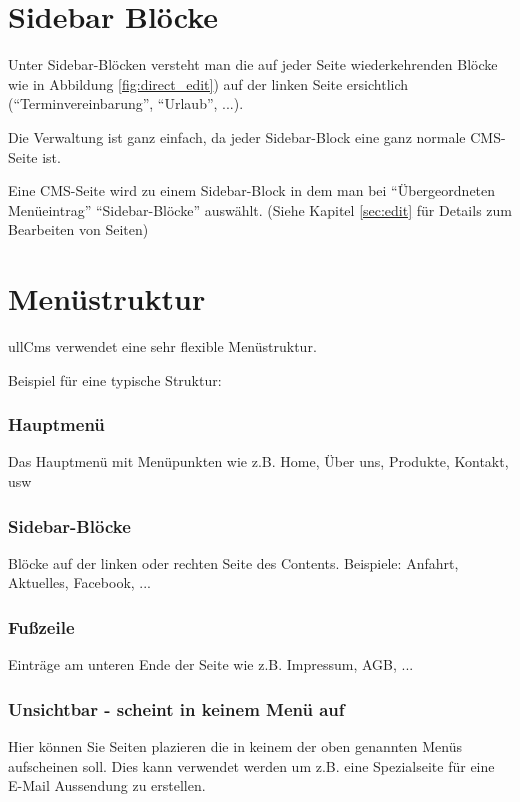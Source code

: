 \documentclass[article, a4paper, oneside, 11pt]{memoir}
\begin{document}
\section{Sidebar Blöcke}

Unter Sidebar-Blöcken versteht man die auf jeder Seite wiederkehrenden Blöcke wie in Abbildung \vref{fig:direct_edit}) auf der linken Seite ersichtlich ("`Terminvereinbarung"', "`Urlaub"', ...).

Die Verwaltung ist ganz einfach, da jeder Sidebar-Block eine ganz normale CMS-Seite ist.

Eine CMS-Seite wird zu einem Sidebar-Block in dem man bei "`Übergeordneten Menüeintrag"' "`Sidebar-Blöcke"' auswählt. (Siehe Kapitel \vref{sec:edit} für Details zum Bearbeiten von Seiten)


\section{Menüstruktur}

ullCms verwendet eine sehr flexible Menüstruktur. 

Beispiel für eine typische Struktur:

\subsubsection{Hauptmenü}

Das Hauptmenü mit Menüpunkten wie z.B. Home, Über uns, Produkte, Kontakt, usw

\subsubsection{Sidebar-Blöcke}

Blöcke auf der linken oder rechten Seite des Contents. Beispiele: Anfahrt, Aktuelles, Facebook, ...

\subsubsection{Fußzeile}

Einträge am unteren Ende der Seite wie z.B. Impressum, AGB, ...

\subsubsection{Unsichtbar - scheint in keinem Menü auf}

Hier können Sie Seiten plazieren die in keinem der oben genannten Menüs aufscheinen soll. Dies kann verwendet werden um z.B. eine Spezialseite für eine E-Mail Aussendung zu erstellen.
\end{document}
